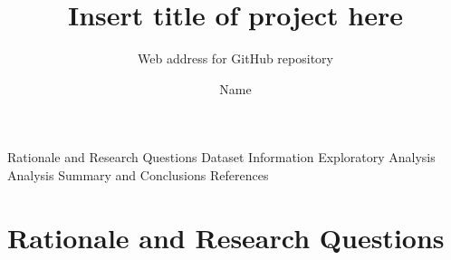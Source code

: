 \documentclass[
  12pt,
]{article}
\title{Insert title of project here}
\subtitle{Web address for GitHub repository}
\author{Name}
\date{}
\begin{document}
\maketitle

\newpage
\tableofcontents

Rationale and Research Questions Dataset Information Exploratory
Analysis Analysis Summary and Conclusions References

\newpage
\listoftables

\newpage
\listoffigures

\newpage

\hypertarget{rationale-and-research-questions}{%
\section{Rationale and Research
Questions}\label{rationale-and-research-questions}}
\end{document}
